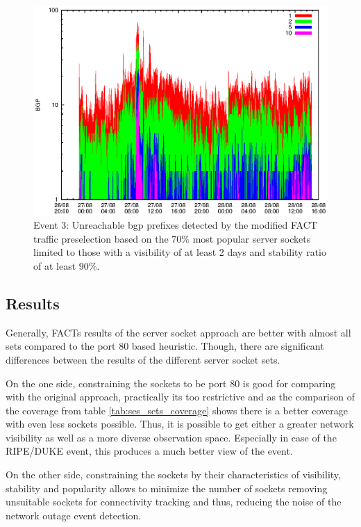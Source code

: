 \begin{figure}
	[p] \centering 
	\includegraphics[width=0.75\linewidth]{images/events/2010_08_27/bgp_log_Set_var_0_1_stab_9_vts_2.eps} \caption{Event 3: Unreachable \gls{bgp} prefixes detected by the modified \gls{FACT} traffic preselection based on the $70\%$ most popular \glspl{server socket} limited to those with a visibility of at least 2 days and stability ratio of at least $90\%$.} 
	\label{fig:RIPE_FACT_popularVTS2STAB9} 
\end{figure}

\newpage 
\subsection{Results}
Generally, \gls{FACT}s results of the \gls{server socket} approach are better with almost all sets compared to the port 80 based heuristic. 
Though, there are significant differences between the results of the different \gls{server socket} sets. 

On the one side, constraining the sockets to be port 80 is good for comparing with the original approach, practically its too restrictive and as the comparison of the coverage from table \ref{tab:ses_sets_coverage} shows there is a better coverage with even less sockets possible.
Thus, it is possible to get either a greater network visibility as well as a more diverse observation space. Especially in case of the RIPE/DUKE event, this produces a much better view of the event.  

On the other side, constraining the sockets by their characteristics of visibility, stability and popularity allows to minimize the number of sockets removing unsuitable sockets for connectivity tracking and thus, reducing the noise of the network outage event detection.